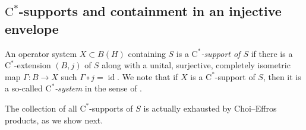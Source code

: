 \documentclass[10pt]{amsart}
\newcommand{\rC}{\mathrm{C}}
\newcommand{\id}{\operatorname{id}}
\theoremstyle{definition}
\begin{document}
\subsection{$\rC^*$-supports and containment in an injective envelope}

An operator system $X\subset B(H)$ containing $S$ is a \emph{$\rC^*$-support of $S$} if there is a $\rC^*$-extension $(B,j)$ of $S$ along with a unital, surjective, completely isometric map  $\Gamma:B\to X$ such $\Gamma\circ j=\id$. We note that if $X$ is a $\rC^*$-support of $S$, then it is a so-called \emph{$\rC^*$-system} in the sense of \cite{KW1998}. 

The collection of all $\rC^*$-supports of $S$ is actually exhausted by Choi--Effros products, as we show next.
\end{document}
